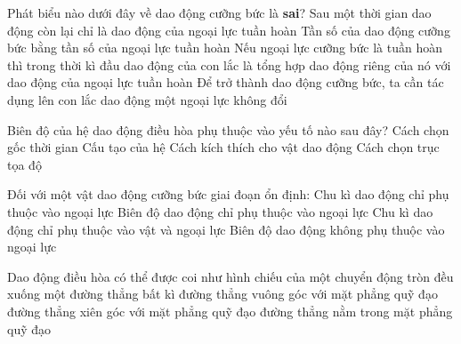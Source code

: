 \begin{ex}%
	Phát biểu nào dưới đây về dao động cưỡng bức là \textbf{sai}?
	\choice
	{Sau một thời gian dao động còn lại chỉ là dao động của ngoại lực tuần hoàn}
	{Tần số của dao động cưỡng bức bằng tần số của ngoại lực tuần hoàn}
	{Nếu ngoại lực cưỡng bức là tuần hoàn thì trong thời kì đầu dao động của con lắc là tổng hợp dao động riêng của nó với dao động của ngoại lực tuần hoàn}
	{\True Để trở thành dao động cưỡng bức, ta cần tác dụng lên con lắc dao động một ngoại lực không đổi}
\end{ex}

\begin{ex}%
	Biên độ của hệ dao động điều hòa phụ thuộc vào yếu tố nào sau đây?
	\choice
	{Cách chọn gốc thời gian}
	{Cấu tạo của hệ}
	{\True Cách kích thích cho vật dao động}
	{Cách chọn trục tọa độ}
\end{ex}

\begin{ex}%
	Đối với một vật dao động cưỡng bức giai đoạn ổn định:
	\choice
	{\True Chu kì dao động chỉ phụ thuộc vào ngoại lực}
	{Biên độ dao động chỉ phụ thuộc vào ngoại lực}
	{Chu kì dao động chỉ phụ thuộc vào vật và ngoại lực}
	{Biên độ dao động không phụ thuộc vào ngoại lực}
\end{ex}

\begin{ex}%
	Dao động điều hòa có thể được coi như hình chiếu của một chuyển động tròn đều xuống một
	\choice
	{đường thẳng bất kì}
	{đường thẳng vuông góc với mặt phẳng quỹ đạo}
	{đường thẳng xiên góc với mặt phẳng quỹ đạo}
	{\True đường thẳng nằm trong mặt phẳng quỹ đạo}
\end{ex}

